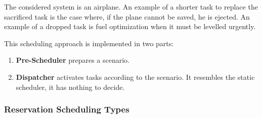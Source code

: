 \documentclass[../main.tex]{subfiles}
\begin{document}
\begin{exmp}
The considered system is an airplane. An example of a shorter task to replace the sacrificed task is the case where, if the plane cannot be saved, he is ejected. An example of a dropped task is fuel optimization when it must be levelled urgently.
\end{exmp}

This scheduling approach is implemented in two parts:
\begin{enumerate}
	\item \textbf{Pre-Scheduler} prepares a scenario.
	\item \textbf{Dispatcher} activates tasks according to the scenario. It resembles the static scheduler, it has nothing to decide.
\end{enumerate}

\subsubsection{Reservation Scheduling Types}
\end{document}
